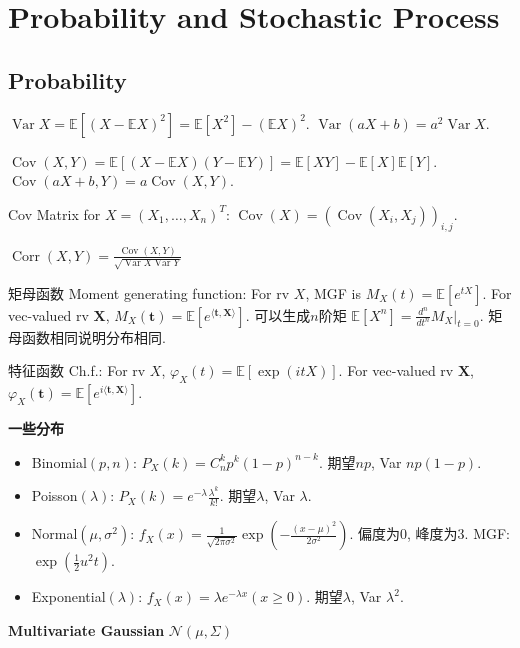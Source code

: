 \documentclass[UTF8]{ctexart}
\begin{document}
\section{Probability and Stochastic Process}

\subsection{Probability}

$\operatorname{Var}X = \mathbb{E}[(X-\mathbb{E}X)^2] = \mathbb{E}[X^2]-(\mathbb{E}X)^2$.
$\operatorname{Var}(aX+b) = a^2 \operatorname{Var}X$.

$\operatorname{Cov}(X,Y) = \mathbb{E}[(X-\mathbb{E}X)(Y-\mathbb{E}Y)] 
= \mathbb{E}[XY]-\mathbb{E}[X]\mathbb{E}[Y]$.
$\operatorname{Cov}(aX+b,Y) = a\operatorname{Cov}(X,Y)$.

Cov Matrix for $X=(X_1,\dots,X_n)^T$: $\operatorname{Cov}(X) = (\operatorname{Cov}(X_i,X_j))_{i,j}$.

$\operatorname{Corr}(X,Y)=\frac{\operatorname{Cov}(X,Y)}{\sqrt{\operatorname{Var}X \operatorname{Var}Y}}$

矩母函数 Moment generating function: For rv $X$, MGF is $M_X(t)=\mathbb{E}[e^{tX}]$.
For vec-valued rv $\mathbf{X}$, $M_X(\mathbf{t})=\mathbb{E}[e^{\langle \mathbf{t},\mathbf{X} \rangle }]$.
可以生成$n$阶矩 $\mathbb{E}[X^n]=\frac{d^n}{dt^n}M_X \Big| _{t=0}$. 矩母函数相同说明分布相同.


特征函数 Ch.f.: For rv $X$, $\varphi_X(t)=\mathbb{E} [\exp(itX)]$.
For vec-valued rv $\mathbf{X}$, $\varphi_X(\mathbf{t})=\mathbb{E}[e^{i \langle \mathbf{t},\mathbf{X} \rangle }]$.

\noindent \textbf{一些分布}
\begin{itemize}

\item Binomial$(p, n)$: $P_X(k)=C_n^k p^k (1-p)^{n-k}$. 期望$np$, Var $np(1-p)$.
\item Poisson$(\lambda)$: $P_X(k)=e^{-\lambda}\frac{\lambda^k}{k!}$. 期望$\lambda$, Var $\lambda$.
\item Normal$(\mu, \sigma^2)$: $f_X(x)=\frac{1}{\sqrt{2\pi\sigma^2}}\exp(-\frac{(x-\mu)^2}{2\sigma^2})$. 偏度为0, 峰度为3. MGF: $\exp (\frac12 u^2 t)$.
\item Exponential$(\lambda)$: $f_X(x) = \lambda e^{-\lambda x}(x\geq 0)$. 期望$\lambda$, Var $\lambda^2$.

\end{itemize}

\noindent \textbf{Multivariate Gaussian} $\mathcal{N}(\mu,\Sigma)$
\end{document}
